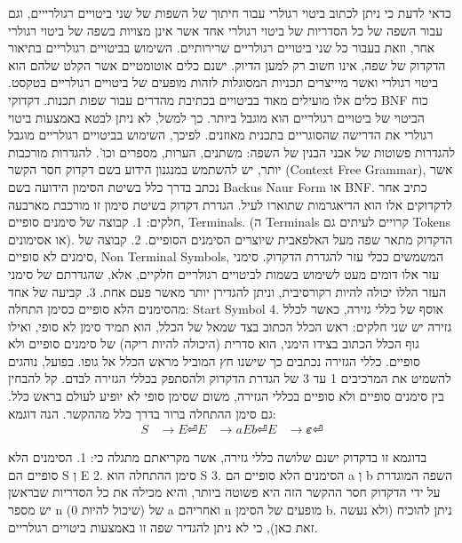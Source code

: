       כדאי לדעת כי ניתן לכתוב ביטוי רגולרי עבור חיתוך של השפות של שני ביטויים
      רגולרייים, וגם עבור השפה של כל הסדריות של ביטוי רגולרי אחד אשר אינן מצויות בשפה
      של ביטוי רגולרי אחר, וזאת בעבור כל שני ביטויים רגולריים שרירותיים. השימוש
      בביטויים רגולריים בתיאור הדקדוק של שפה, אינו חשוב רק למען הדיוק. ישנם כלים
      אוטומטיים אשר הקלט שלהם הוא ביטוי רגולרי ואשר מיייצרים תכניות המסוגלות לזהות
      מופעים של ביטויים רגולריים בטקסט. כלים אלו מועילים מאוד בביטויים בכתיבת מהדרים
      עבור שפות תכנות.
      דקדוקי BNF
      כוח הביטוי של ביטויים רגולריים הוא מוגבל ביותר. כך למשל, לא ניתן לבטא באמצעות
      ביטוי רגולרי את הדרישה שהסוגריים בתכנית מאוזנים. לפיכך, השימוש בביטויים
      רגולריים מוגבל להגדרות פשוטות של אבני הבנין של השפה: משתנים, הערות, מספרים
      וכו'. להגדרות מורכבות יותר, יש להשתמש במנגנון הידוע בשם דקדוק חסר הקשר
      (Context Free Grammar), אשר נכתב בדרך כלל בשיטת הסימון הידועה בשם Backus Naur
      Form או BNF. כתיב אחר לדקדוקים אלו הוא הדיאגרמות שתוארו לעיל.
      הגדרת דקדוק בשיטת סימון זו מורכבת מארבעה חלקים:
      1. קבוצה של סימנים סופיים, Terminals. (ה Terminals קרויים
      לעיתים גם Tokens או אסימונים). הדקדוק מתאר שפה מעל האלפאבית
      שיוצרים הסימנים הסופיים.
      2. קבוצה של סימנים לא סופיים, Non Terminal Symbols, המשמשים
      ככלי עזר להגדרת הדקדוק. סימני עזר אלו דומים מעט לשימוש בשמות
      לביטויים רגולריים חלקיים, אלא, שהגדרתם של סימני העזר הללו
      יכולה להיות רקורסיבית, וניתן להגדירן יותר מאשר פעם אחת.
      3. קביעה של אחד מהסימנים הלא סופיים כסימן התחלה: Start Symbol
      4. אוסף של כללי גזירה, כאשר לכלל גזירה יש שני חלקים: ראש הכלל
      הכתוב בצד שמאל של הכלל, הוא תמיד סימן לא סופי, ואילו גוף הכלל
      הכתוב בצידו הימני, הוא סדרית (היכולה להיות ריקה) של סימנים
      סופיים ולא סופיים. כללי הגזירה נכתבים כך שישנו חץ המוביל מראש
      הכלל אל גופו. בפועל, נוהגים להשמיט את המרכיבים 1 עד 3 של
      הגדרת הדקדוק ולהסתפק בכללי הגזירה לבדם. קל להבחין בין סימנים
      סופיים ולא סופיים בכללי הגזירה, משום שסימן סופי לא יופיע
      לעולם בראש כלל. גם סימן ההתחלה ברור בדרך כלל מההקשר.
      הנה דוגמא:
      \begin{align}
        S &→E ⏎
        E &→a E b ⏎
        E &→𝜺 ⏎
      \end{align}

      בדוגמא זו בדקדוק ישנם שלושה כללי גזירה, אשר מקריאתם מתגלה כי:
      1. הסימנים הלא סופיים הם S וְ E
      2. סימן ההתחלה הוא S
      3. הסימנים הלא סופיים הם a וְ b
      השפה המוגדרת על ידי הדקדוק חסר ההקשר הזה היא פשוטה ביותר, והיא מכילה את כל
      הסדריות שבראשן יש מספר n (שיכול להיות 0) של a ואחריהם n מופעים של הסימן b.
      ניתן להוכיח (ולא נעשה זאת כאן), כי לא ניתן להגדיר שפה זו באמצעות ביטויים
      רגולריים.

